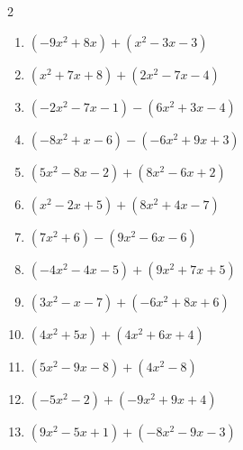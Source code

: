 \begin{multicols}{2}
\begin{enumerate}

  \item $(-9x^{2}+8x)+(x^{2}-3x-3)$


  \item $(x^{2}+7x+8)+(2x^{2}-7x-4)$


  \item $(-2x^{2}-7x-1)-(6x^{2}+3x-4)$


  \item $(-8x^{2}+x-6)-(-6x^{2}+9x+3)$


  \item $(5x^{2}-8x-2)+(8x^{2}-6x+2)$


  \item $(x^{2}-2x+5)+(8x^{2}+4x-7)$


  \item $(7x^{2}+6)-(9x^{2}-6x-6)$


  \item $(-4x^{2}-4x-5)+(9x^{2}+7x+5)$


\columnbreak %

  \item $(3x^{2}-x-7)+(-6x^{2}+8x+6)$


  \item $(4x^{2}+5x)+(4x^{2}+6x+4)$


  \item $(5x^{2}-9x-8)+(4x^{2}-8)$


  \item $(-5x^{2}-2)+(-9x^{2}+9x+4)$


  \item $(9x^{2}-5x+1)+(-8x^{2}-9x-3)$



\end{enumerate}
\end{multicols}
